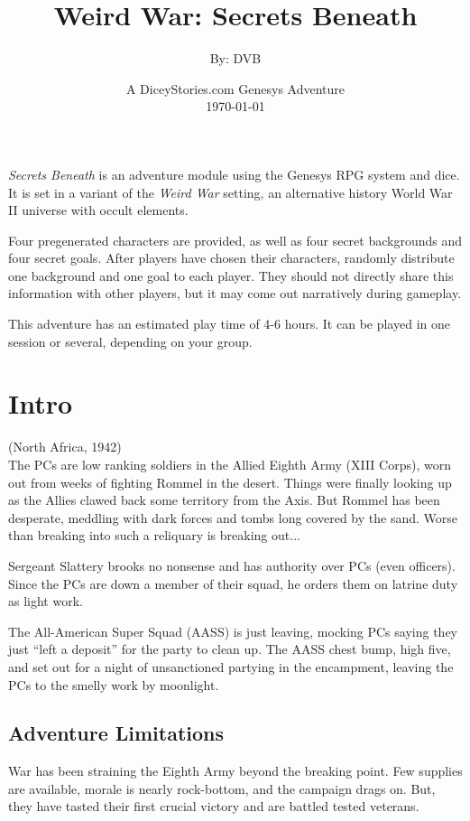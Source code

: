 \documentclass{book}
\title{Weird War: Secrets Beneath}
\author{By: DVB}
\date{A DiceyStories.com Genesys Adventure\\
      \today}
\newcommand{\gb}{\emph{Secrets Beneath} }
\begin{document}
\maketitle

\begin{multicols}{2}

\gb is an adventure module using the Genesys RPG system and dice.  It is set in a variant of the \emph{Weird War} setting, an alternative history World War II universe with occult elements.

Four pregenerated characters are provided, as well as four secret backgrounds and four secret goals.  After players have chosen their characters, randomly distribute one background and one goal to each player.  They should not directly share this information with other players, but it may come out narratively during gameplay.

This adventure has an estimated play time of 4-6 hours.  It can be played in one session or several, depending on your group.

\section{Intro}
(North Africa, 1942)\\

    The PCs are low ranking soldiers in the Allied Eighth Army (XIII Corps), worn out from weeks of fighting Rommel in the desert.  Things were finally looking up as the Allies clawed back some territory from the Axis.  But Rommel has been desperate, meddling with dark forces and tombs long covered by the sand.  Worse than breaking into such a reliquary is breaking out...

    Sergeant Slattery brooks no nonsense and has authority over PCs (even officers).  Since the PCs are down a member of their squad, he orders them on latrine duty as light work.

    The All-American Super Squad (AASS) is just leaving, mocking PCs saying they just ``left a deposit'' for the party to clean up.  The AASS chest bump, high five, and set out for a night of unsanctioned partying in the encampment, leaving the PCs to the smelly work by moonlight.

\subsection{Adventure Limitations}

    War has been straining the Eighth Army beyond the breaking point.  Few supplies are available, morale is nearly rock-bottom, and the campaign drags on.  But, they have tasted their first crucial victory and are battled tested veterans.
    

\end{multicols}
\end{document}
